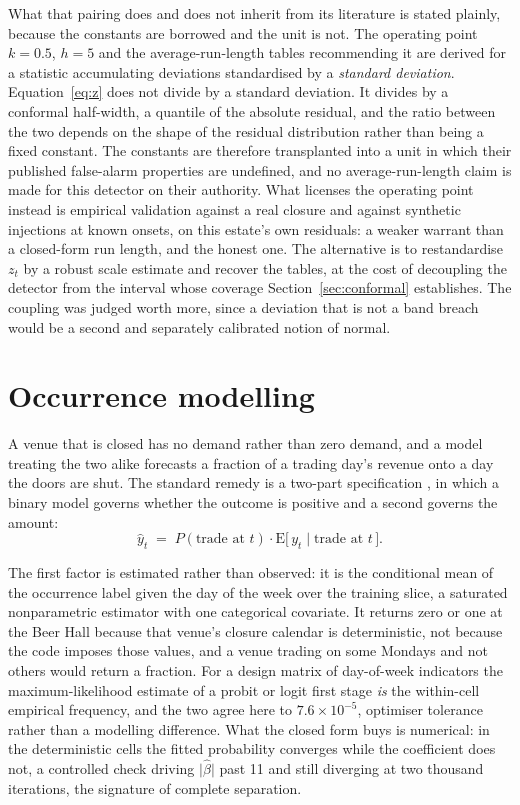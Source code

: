 What that pairing does and does not inherit from its literature is stated plainly, because the
constants are borrowed and the unit is not. The operating point $k = 0.5$, $h = 5$ and the
average-run-length tables recommending it are derived for a statistic accumulating deviations
standardised by a \emph{standard deviation}. Equation~\ref{eq:z} does not divide by a standard
deviation. It divides by a conformal half-width, a quantile of the absolute residual, and the
ratio between the two depends on the shape of the residual distribution rather than being a fixed
constant. The constants are therefore transplanted into a unit in which their published
false-alarm properties are undefined, and no average-run-length claim is made for this detector on
their authority. What licenses the operating point instead is empirical validation against a real
closure and against synthetic injections at known onsets, on this estate's own residuals: a
weaker warrant than a closed-form run length, and the honest one. The alternative is to
restandardise $z_t$ by a robust scale estimate and recover the tables, at the cost of decoupling
the detector from the interval whose coverage Section~\ref{sec:conformal} establishes. The
coupling was judged worth more, since a deviation that is not a band breach would be a second and
separately calibrated notion of normal.

\section{Occurrence modelling}
\label{sec:occurrence}

A venue that is closed has no demand rather than zero demand, and a model treating the two alike
forecasts a fraction of a trading day's revenue onto a day the doors are shut. The standard
remedy is a two-part specification \citep{cragg_statistical_1971, mullahy_specification_1986}, in
which a binary model governs whether the outcome is positive and a second governs the amount:
\begin{equation}
\hat{y}_t \;=\; P(\text{trade at } t) \cdot \mathrm{E}\bigl[\,y_t \mid \text{trade at } t\,\bigr].
\label{eq:hurdle}
\end{equation}

The first factor is estimated rather than observed: it is the conditional mean of the occurrence
label given the day of the week over the training slice, a saturated nonparametric estimator with
one categorical covariate. It returns zero or one at the Beer Hall because that venue's closure
calendar is deterministic, not because the code imposes those values, and a venue trading on some
Mondays and not others would return a fraction. For a design matrix of day-of-week indicators the
maximum-likelihood estimate of a probit or logit first stage \emph{is} the within-cell empirical
frequency, and the two agree here to $7.6 \times 10^{-5}$, optimiser tolerance rather than a
modelling difference. What the closed form buys is numerical: in the deterministic cells the
fitted probability converges while the coefficient does not, a controlled check driving
$\lvert\hat{\beta}\rvert$ past 11 and still diverging at two thousand iterations, the signature of
complete separation.

